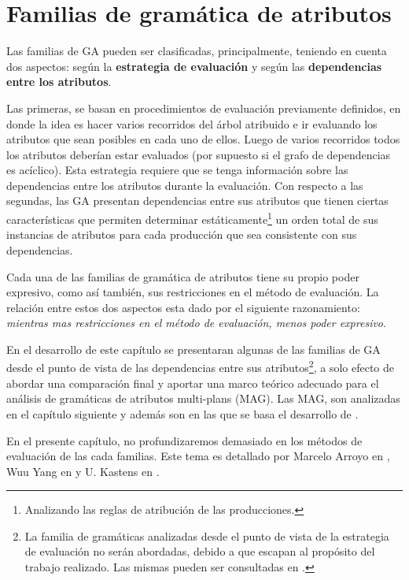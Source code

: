 \chapter{Familias de gramática de atributos}
\label{chap:clas_ag}
\minitoc

Las familias de GA pueden ser clasificadas, principalmente, teniendo en cuenta dos aspectos: según la \textbf{estrategia de evaluación} y según las \textbf{dependencias entre los atributos}. 

Las primeras, se basan en procedimientos de evaluación previamente definidos, en donde la idea es hacer varios recorridos del árbol atribuido e ir evaluando los atributos que sean posibles en cada uno de ellos. Luego de varios recorridos todos los atributos deberían estar evaluados (por supuesto si el grafo de dependencias es acíclico). Esta estrategia requiere que se tenga información sobre las dependencias entre los atributos durante la evaluación. Con respecto a las segundas, las GA presentan dependencias entre sus atributos que tienen ciertas características que permiten determinar estáticamente\footnote{Analizando las reglas de atribución de las producciones.} un orden total de sus instancias de atributos para cada producción que sea consistente con sus dependencias. 

Cada una de las familias de gramática de atributos tiene su propio poder expresivo, como así también, sus restricciones en el método de evaluación. La relación entre estos dos aspectos esta dado por el siguiente razonamiento: \textit{mientras mas restricciones en el método de evaluación, menos poder expresivo}.

En el desarrollo de este capítulo se presentaran algunas de las familias de GA desde el punto de vista de las dependencias entre sus atributos\footnote{La familia de gramáticas analizadas desde el punto de vista de la estrategia de evaluación no serán abordadas, debido a que escapan al propósito del trabajo realizado. Las mismas pueden ser consultadas en \cite{tesismarcelo}.}, a solo efecto de abordar una comparación final y aportar una marco teórico adecuado para el análisis de gramáticas de atributos multi-plans (MAG). Las MAG, son analizadas en el capítulo siguiente y además son en las que se basa el desarrollo de \maggen. 

En el presente capítulo, no profundizaremos demasiado en los métodos de evaluación de las cada familias. Este tema es detallado por Marcelo Arroyo en \cite{tesismarcelo}, Wuu Yang en \cite{wuu-yang2} y U. Kastens en \cite{kastens}.

